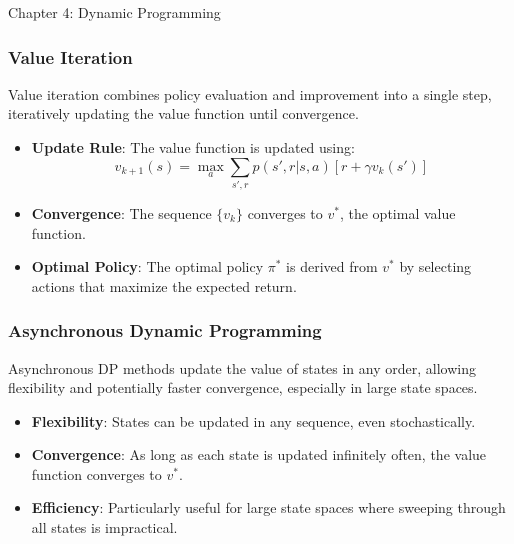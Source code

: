 \begin{notes}{Chapter 4: Dynamic Programming}
\begin{highlight}
    \end{highlight}
    
    \subsubsection*{Value Iteration}
    
    Value iteration combines policy evaluation and improvement into a single step, iteratively updating the value function until convergence.
    
    \begin{highlight}
    
        \begin{itemize}
            \item \textbf{Update Rule}: The value function is updated using:
            \[
            v_{k+1}(s) = \max_a \sum_{s', r} p(s', r | s, a) \left[ r + \gamma v_k(s') \right]
            \]
            \item \textbf{Convergence}: The sequence \(\{v_k\}\) converges to \(v^*\), the optimal value function.
            \item \textbf{Optimal Policy}: The optimal policy \(\pi^*\) is derived from \(v^*\) by selecting actions that maximize the expected return.
        \end{itemize}
    
    \end{highlight}
    
    \subsubsection*{Asynchronous Dynamic Programming}
    
    Asynchronous DP methods update the value of states in any order, allowing flexibility and potentially faster convergence, especially in large state spaces.
    
    \begin{highlight}
    
        \begin{itemize}
            \item \textbf{Flexibility}: States can be updated in any sequence, even stochastically.
            \item \textbf{Convergence}: As long as each state is updated infinitely often, the value function converges to \(v^*\).
            \item \textbf{Efficiency}: Particularly useful for large state spaces where sweeping through all states is impractical.
        \end{itemize}
    

\end{highlight}
\end{notes}
